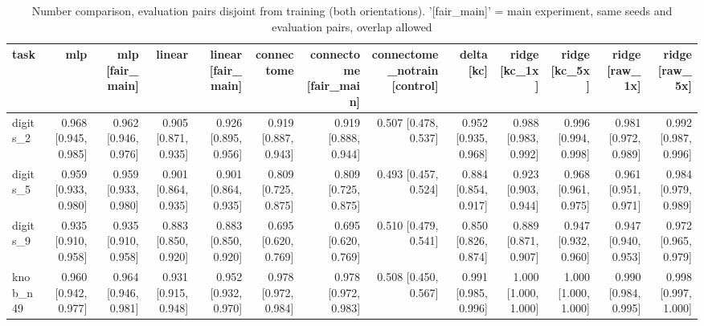 \begin{table}[t]
\centering
\small
\begin{tabular}{lrrrrrrrrrrrr}
\toprule
task & mlp & mlp [fair\_main] & linear & linear [fair\_main] & connectome & connectome [fair\_main] & connectome\_notrain [control] & delta [kc] & ridge [kc\_1x] & ridge [kc\_5x] & ridge [raw\_1x] & ridge [raw\_5x] \\
\midrule
digits\_2 & 0.968 [0.945, 0.985] & 0.962 [0.946, 0.976] & 0.905 [0.871, 0.935] & 0.926 [0.895, 0.956] & 0.919 [0.887, 0.943] & 0.919 [0.888, 0.944] & 0.507 [0.478, 0.537] & 0.952 [0.935, 0.968] & 0.988 [0.983, 0.992] & 0.996 [0.994, 0.998] & 0.981 [0.972, 0.989] & 0.992 [0.987, 0.996] \\
digits\_5 & 0.959 [0.933, 0.980] & 0.959 [0.933, 0.980] & 0.901 [0.864, 0.935] & 0.901 [0.864, 0.935] & 0.809 [0.725, 0.875] & 0.809 [0.725, 0.875] & 0.493 [0.457, 0.524] & 0.884 [0.854, 0.917] & 0.923 [0.903, 0.944] & 0.968 [0.961, 0.975] & 0.961 [0.951, 0.971] & 0.984 [0.979, 0.989] \\
digits\_9 & 0.935 [0.910, 0.958] & 0.935 [0.910, 0.958] & 0.883 [0.850, 0.920] & 0.883 [0.850, 0.920] & 0.695 [0.620, 0.769] & 0.695 [0.620, 0.769] & 0.510 [0.479, 0.541] & 0.850 [0.826, 0.874] & 0.889 [0.871, 0.907] & 0.947 [0.932, 0.960] & 0.947 [0.940, 0.953] & 0.972 [0.965, 0.979] \\
knob\_n49 & 0.960 [0.942, 0.977] & 0.964 [0.946, 0.981] & 0.931 [0.915, 0.948] & 0.952 [0.932, 0.970] & 0.978 [0.972, 0.984] & 0.978 [0.972, 0.983] & 0.508 [0.450, 0.567] & 0.991 [0.985, 0.996] & 1.000 [1.000, 1.000] & 1.000 [1.000, 1.000] & 0.990 [0.984, 0.995] & 0.998 [0.997, 1.000] \\
\bottomrule
\end{tabular}
\caption{Number comparison, evaluation pairs disjoint from training (both orientations). '[fair\_main]' = main experiment, same seeds and evaluation pairs, overlap allowed}
\label{tab:disjoint_cmp_final_acc}
\end{table}